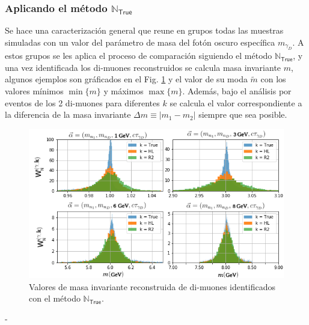\subsubsection{Aplicando el método $\mathbb{N}_\textsf{True}$}
Se hace una caracterización general que reune en grupos todas las muestras simuladas con un valor del parámetro de masa del fotón oscuro específica $m_{\gamma_D}$. A estos grupos se les aplica el proceso de comparación siguiendo el método $\mathbb{N}_\textsf{True}$, y una vez identificada los di-muones reconstruidos se calcula masa invariante $m$, algunos ejemplos son gráficados en el Fig. \ref{mass_inv} y el valor de su moda $\widetilde{m}$ con los valores mínimos $\min{\{m\}}$ y máximos $\max{\{m\}}$. Además, bajo el análisis por eventos de los 2 di-muones para diferentes $k$ se calcula el valor correspondiente a la diferencia de la masa invariante $\Delta m\equiv|m_1-m_2|$ siempre que sea posible.


\begin{figure}[!h]
\centering
\includegraphics[width=.95\textwidth]{Cap4/imagenes/foton_mass.png}
\caption{Valores de masa invariante reconstruida de di-muones identificados con el método $\mathbb{N}_\textsf{True}$.}
\label{mass_inv}
\end{figure}-

